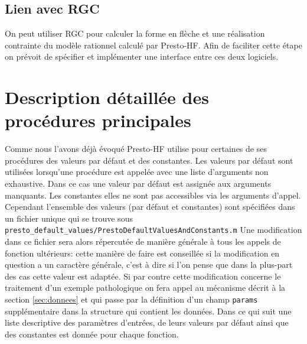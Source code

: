 \documentclass[12]{article}
\def\prest{Presto-HF\xspace}
\begin{document}
\subsection{Lien avec RGC}

On peut utiliser RGC pour calculer la forme en fl\`eche et une
r\'ealisation contrainte du mod\`ele rationnel calcul\'e par
\prest. Afin de faciliter cette \'etape on pr\'evoit de sp\'ecifier et
impl\'ementer une interface entre ces deux logiciels.         

\section{Description d\'etaill\'ee des proc\'edures principales}
\label{sec:det}
Comme nous l'avons d\'ej\`a \'evoqu\'e \prest utilise pour certaines de
ses proc\'edures des valeurs par d\'efaut et des constantes. Les valeurs
par d\'efaut sont utilis\'ees lorsqu'une proc\'edure est appel\'ee avec
une liste d'arguments non exhaustive. Dans ce cas une valeur par d\'efaut
est assign\'ee aux arguments manquants. Les constantes elles ne sont pas
accessibles via les arguments d'appel. Cependant l'ensemble des valeurs 
(par d\'efaut et constantes) sont sp\'ecifi\'ees dans un fichier unique qui se 
trouve sous
\verb+presto_default_values/PrestoDefaultValuesAndConstants.m+
Une modification dans ce fichier sera alors r\'epercut\'ee de mani\`ere g\'en\'erale 
\`a tous les appels de fonction ult\'erieurs: cette mani\`ere de faire
est conseill\'ee si la modification en question a un caract\`ere
g\'en\'erale, c'est \`a dire si l'on pense que dans la plus-part des cas
cette valeur est adapt\'ee. Si par contre cette modification concerne le 
traitement d'un exemple pathologique on fera appel au m\'ecanisme d\'ecrit 
\`a la section \ref{sec:donnees} et qui passe par la d\'efinition d'un champ
\verb+params+ suppl\'ementaire dans la structure qui contient les donn\'ees. 
Dans ce qui suit une liste descriptive des
param\`etres d'entr\'ees, de leurs valeurs
par d\'efaut ainsi que des constantes est donn\'ee pour chaque fonction. 
\newline

 

\vspace{1cm}



\vspace{1cm}


\end{document}
